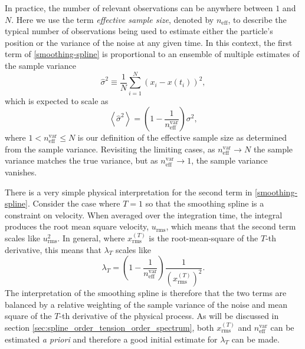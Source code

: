 \documentclass{ametsoc}
\begin{document}
In practice, the number of relevant observations can be anywhere between $1$ and $N$. Here we use the term \emph{effective sample size}, denoted by $n_{\textrm{eff}}$, to describe the typical number of observations being used to estimate either the particle's position or the variance of the noise at any given time. In this context, the first term of \eqref{smoothing-spline} is proportional to an ensemble of multiple estimates of the sample variance
\begin{equation}
\label{sample_variance}
\hat{\sigma}^2  \equiv \frac{1}{N} \sum_{i=1}^{N} \left( x_i - x(t_i) \right) ^2,
\end{equation}
which is expected to scale as
\begin{equation}
\label{sample_variance_variance}
\left\langle \hat{\sigma}^2 \right\rangle = \left( 1 -  \frac{1}{n^\textrm{var}_{\textrm{eff}}} \right) \sigma^2,
\end{equation}
where $1 < n^\textrm{var}_{\textrm{eff}} \le N$ is our definition of the effective sample size as determined from the sample variance. Revisiting the limiting cases, as $n^\textrm{var}_{\textrm{eff}} \rightarrow N$ the sample variance matches the true variance, but as $n^\textrm{var}_{\textrm{eff}} \rightarrow 1$, the sample variance vanishes. 

There is a very simple physical interpretation for the second term in \eqref{smoothing-spline}. Consider the case where $T=1$ so that the smoothing spline is a constraint on velocity. When averaged over the integration time, the integral produces the root mean square velocity, $u_{\textrm{rms}}$, which means that the second term scales like $u_{\textrm{rms}}^2$. In general, where $x^{(T)}_{\textrm{rms}}$ is the root-mean-square of the $T$-th derivative, this means that $\lambda_T$ scales like
\begin{equation}
\label{lambda}
\lambda_T = \left( 1 -\frac{1}{n^\textrm{var}_{\textrm{eff}}} \right) \frac{1}{ \left(x^{(T)}_{\textrm{rms}}\right)^2}.
\end{equation}
The interpretation of the smoothing spline is therefore that the two terms are balanced by a relative weighting of the sample variance of the noise and mean square of the $T$-th derivative of the physical process. As will be discussed in section \ref{sec:spline_order_tension_order_spectrum}, both $x^{(T)}_{\textrm{rms}}$ and $n^\textrm{var}_{\textrm{eff}}$ can be estimated \emph{a priori} and therefore a good initial estimate for $\lambda_T$ can be made.

\end{document}
